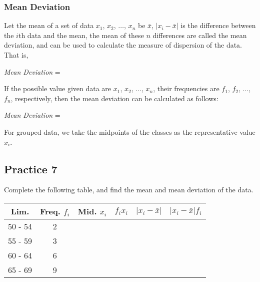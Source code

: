 \documentclass{report}
\begin{document}
\begin{multicols}{2}
  \subsubsection*{Mean Deviation}

  Let the mean of a set of data $x_1$, $x_2$, $\ldots$, $x_n$ be $\bar{x}$, $|x_i
    - \bar{x}|$ is the difference between the $i$th data and the mean, the mean of
  these $n$ differences are called the mean deviation, and can be used to
  calculate the measure of dispersion of the data. That is,
  \begin{cequation}
    \textit{Mean Deviation} = 
  \end{cequation}

  If the possible value given data are $x_1$, $x_2$, $\ldots$, $x_n$, their
  frequencies are $f_1$, $f_2$, $\ldots$, $f_n$, respectively, then the mean
  deviation can be calculated as follows:
  \begin{cequation}
    \textit{Mean Deviation} = 
  \end{cequation}

  For grouped data, we take the midpoints of the classes as the representative
  value $x_i$.

  \subsection{Practice 7}

  Complete the following table, and find the mean and mean deviation of the data.
  \begin{center}
    \begin{tabular}{|c|c|c|c|c|c|}
      \hline
      Lim.    & Freq. $f_i$ & Mid. $x_i$ & $f_ix_i$ & $|x_i - \bar{x}|$ & $|x_i - \bar{x}|f_i$ \\
      \hline
      50 - 54 & 2           &            &          &                   &                      \\
      55 - 59 & 3           &            &          &                   &                      \\
      60 - 64 & 6           &            &          &                   &                      \\
      65 - 69 & 9           &            &          &                   &                      \\
      \hline
    \end{tabular}
  \end{center}


\end{multicols}
\end{document}
